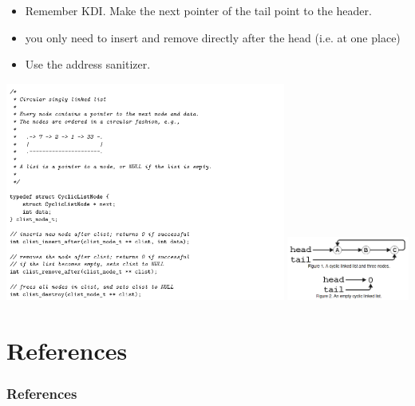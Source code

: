 \documentclass[10pt]{beamer}
\begin{document}
\begin{frame}{}
            \begin{itemize}
                \item Remember KDI. Make the next pointer of the tail point to the header.
                \item you only need to insert and remove directly after the head (i.e. at one place)
                \item Use the address sanitizer.
            \end{itemize}
            \framebreak
            \includegraphics[keepaspectratio, width=0.69\textwidth, height=\textheight]{img/ex9_103_1.png}
            \includegraphics[keepaspectratio, width=0.3\textwidth, height=\textheight]{img/cyc.png} \\

        \end{frame}

        \section{References}
        \begin{frame}[allowframebreaks]
            \frametitle{References}
            \begin{tiny}
                \nocite{*}
                \printbibliography
            \end{tiny}
        \end{frame}


    
\end{document}
